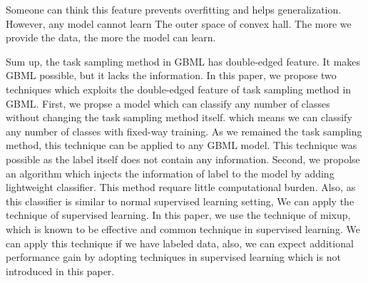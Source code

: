 \documentclass[letterpaper]{article} %
\begin{document}
{Someone can think this feature prevents overfitting and helps generalization. However, any model cannot learn
The outer space of convex hall. The more we provide the data, the more the model can learn.

Sum up, the task sampling method in GBML has double-edged feature. It makes GBML possible, but it lacks the information.
In this paper, we propose two techniques which exploits the double-edged feature of task sampling method in GBML.
First, we propse a model which can classify any number of classes without changing the task sampling method itself.
which means we can classify any number of classes with fixed-way training. As we remained the task sampling method, this technique can be applied to any GBML model. This technique was possible as the label itself does not contain any information. Second, we propolse an algorithm which injects the information of label to the model by adding lightweight classifier. This method requare little computational burden. Also, as this classifier is similar to normal supervised learning setting,
We can apply the technique of supervised learning. In this paper, we use the technique of mixup, which is known to be effective
and common technique in supervised learning. We can apply this technique if we have labeled data, also, we can expect
additional performance gain by adopting techniques in supervised learning which is not introduced in this paper.



}
\end{document}
